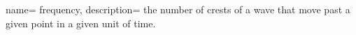  {
    name= frequency,
    description= {the number of crests of a wave that move past a given point in a given unit of time.}
}
